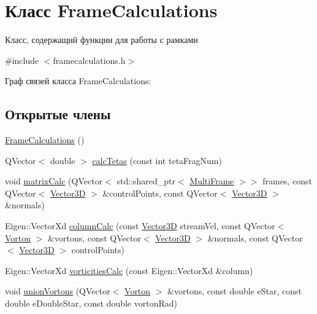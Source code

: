 \hypertarget{class_frame_calculations}{}\section{Класс Frame\+Calculations}
\label{class_frame_calculations}


Класс, содержащий функции для работы с рамками  




{\ttfamily \#include $<$framecalculations.\+h$>$}



Граф связей класса Frame\+Calculations\+:
\subsection*{Открытые члены}
\begin{DoxyCompactItemize}
\item 
\mbox{\hyperlink{class_frame_calculations_a4175dc61a498d4b905abb48e0e202052}{Frame\+Calculations}} ()
\item 
Q\+Vector$<$ double $>$ \mbox{\hyperlink{class_frame_calculations_aa0d92606bc8a66387657521b8cac1a0f}{calc\+Tetas}} (const int teta\+Frag\+Num)
\item 
void \mbox{\hyperlink{class_frame_calculations_affd2bc2a5ee409d78ddab871a75e2d7c}{matrix\+Calc}} (Q\+Vector$<$ std\+::shared\+\_\+ptr$<$ \mbox{\hyperlink{class_multi_frame}{Multi\+Frame}} $>$$>$ frames, const Q\+Vector$<$ \mbox{\hyperlink{class_vector3_d}{Vector3D}} $>$ \&control\+Points, const Q\+Vector$<$ \mbox{\hyperlink{class_vector3_d}{Vector3D}} $>$ \&normals)
\item 
Eigen\+::\+Vector\+Xd \mbox{\hyperlink{class_frame_calculations_aac24f14642695a675439a535f6215c37}{column\+Calc}} (const \mbox{\hyperlink{class_vector3_d}{Vector3D}} stream\+Vel, const Q\+Vector$<$ \mbox{\hyperlink{class_vorton}{Vorton}} $>$ \&vortons, const Q\+Vector$<$ \mbox{\hyperlink{class_vector3_d}{Vector3D}} $>$ \&normals, const Q\+Vector$<$ \mbox{\hyperlink{class_vector3_d}{Vector3D}} $>$ control\+Points)
\item 
Eigen\+::\+Vector\+Xd \mbox{\hyperlink{class_frame_calculations_a8d7e2813ad4725d6866ecfe3b5a1b76c}{vorticities\+Calc}} (const Eigen\+::\+Vector\+Xd \&column)
\item 
void \mbox{\hyperlink{class_frame_calculations_aaa9598a64ef87159b79348f4d0d28262}{union\+Vortons}} (Q\+Vector$<$ \mbox{\hyperlink{class_vorton}{Vorton}} $>$ \&vortons, const double e\+Star, const double e\+Double\+Star, const double vorton\+Rad)
$$
\end{DoxyCompactItemize}

